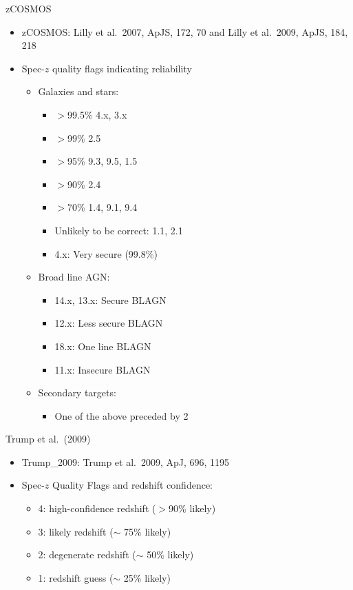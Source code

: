 \documentclass[12pt,onecolumn]{article}
\begin{document}
\noindent zCOSMOS
\begin{itemize}
\item zCOSMOS: Lilly et al.\ 2007, ApJS, 172, 70 and Lilly et al.\ 2009, ApJS, 184, 218
\item Spec-$z$ quality flags indicating reliability
    \begin{itemize}
        \item Galaxies and stars:
        \begin{itemize}
            \item $>$99.5\% 4.x, 3.x
            \item $>$99\% 2.5
            \item $>$95\% 9.3, 9.5, 1.5
            \item $>$90\% 2.4
            \item $>$70\% 1.4, 9.1, 9.4
            \item Unlikely to be correct: 1.1, 2.1
            \item 4.x: Very secure (99.8\%)
        \end{itemize}

        \item Broad line AGN:
        \begin{itemize}
            \item 14.x, 13.x:  Secure BLAGN
            \item 12.x:        Less secure BLAGN
            \item 18.x:        One line BLAGN
            \item 11.x:        Insecure BLAGN
        \end{itemize}

        \item Secondary targets:
        \begin{itemize}
            \item One of the above preceded by 2
        \end{itemize}
    \end{itemize}
\end{itemize}

\noindent Trump et al.\ (2009)
\begin{itemize}
\item Trump\_2009: Trump et al.\ 2009, ApJ, 696, 1195
\item Spec-$z$ Quality Flags and redshift confidence:
    \begin{itemize}
        \item 4: high-confidence redshift ($>$90\% likely)
        \item 3: likely redshift ($\sim$ 75\% likely)
        \item 2: degenerate redshift ($\sim$ 50\% likely)
        \item 1: redshift guess ($\sim$ 25\% likely)
    \end{itemize}
\end{itemize}
\end{document}
